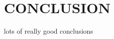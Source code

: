 \documentclass[letterpaper, 10 pt, conference]{ieeeconf}  %
\begin{document}
\section{CONCLUSION}

lots of really good conclusions









\end{document}
